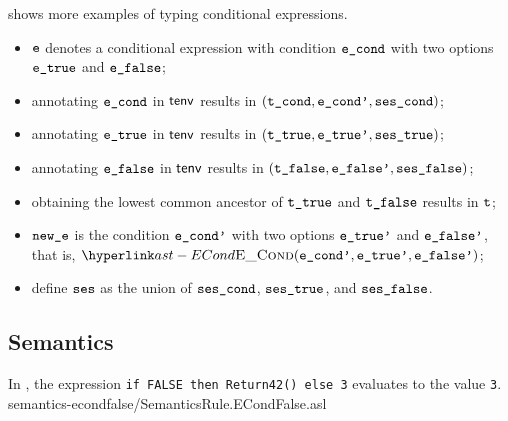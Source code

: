  shows more examples of typing conditional expressions.

\ProseParagraph
\AllApply
\begin{itemize}
  \item $\ve$ denotes a conditional expression with condition $\econd$ with two options $\etrue$ and $\efalse$;
  \item annotating $\econd$ in $\tenv$ results in $(\tcond, \econdp, \vsescond)$\ProseOrTypeError;
  \item annotating $\etrue$ in $\tenv$ results in $(\ttrue, \etruep, \vsestrue)$\ProseOrTypeError;
  \item annotating $\efalse$ in $\tenv$ results in $(\tfalse, \efalsep, \vsesfalse)$;
  \item obtaining the lowest common ancestor of $\ttrue$ and $\tfalse$ results in $\vt$\ProseOrTypeError;
  \item $\newe$ is the condition $\econdp$ with two options $\etruep$ and $\efalsep$, that is, $\ECond(\econdp, \etruep, \efalsep)$;
  \item define $\vses$ as the union of $\vsescond$, $\vsestrue$, and $\vsesfalse$.
\end{itemize}
\FormallyParagraph
\begin{mathpar}
\end{mathpar}

\subsection{Semantics}
In ,
the expression \texttt{if FALSE then Return42() else 3} evaluates to the value \texttt{3}.
{semantics-econdfalse}{\semanticstests/SemanticsRule.ECondFalse.asl}

